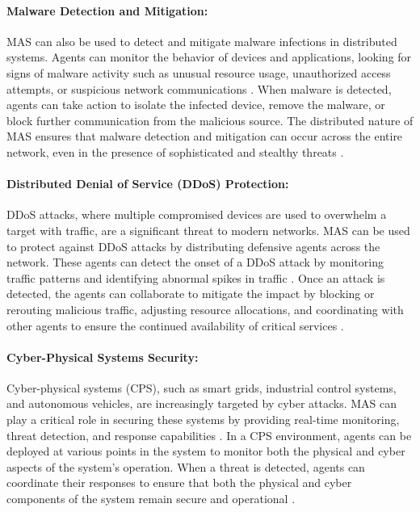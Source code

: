 \paragraph{Malware Detection and Mitigation:}
MAS can also be used to detect and mitigate malware infections in distributed systems. Agents can monitor the behavior of devices and applications, looking for signs of malware activity such as unusual resource usage, unauthorized access attempts, or suspicious network communications \cite{buczak2016survey}. When malware is detected, agents can take action to isolate the infected device, remove the malware, or block further communication from the malicious source. The distributed nature of MAS ensures that malware detection and mitigation can occur across the entire network, even in the presence of sophisticated and stealthy threats \cite{buczak2016survey}.

\paragraph{Distributed Denial of Service (DDoS) Protection:}
DDoS attacks, where multiple compromised devices are used to overwhelm a target with traffic, are a significant threat to modern networks. MAS can be used to protect against DDoS attacks by distributing defensive agents across the network. These agents can detect the onset of a DDoS attack by monitoring traffic patterns and identifying abnormal spikes in traffic \cite{buczak2016survey}. Once an attack is detected, the agents can collaborate to mitigate the impact by blocking or rerouting malicious traffic, adjusting resource allocations, and coordinating with other agents to ensure the continued availability of critical services \cite{buczak2016survey}.

\paragraph{Cyber-Physical Systems Security:}
Cyber-physical systems (CPS), such as smart grids, industrial control systems, and autonomous vehicles, are increasingly targeted by cyber attacks. MAS can play a critical role in securing these systems by providing real-time monitoring, threat detection, and response capabilities \cite{kolias2011swarm}. In a CPS environment, agents can be deployed at various points in the system to monitor both the physical and cyber aspects of the system's operation. When a threat is detected, agents can coordinate their responses to ensure that both the physical and cyber components of the system remain secure and operational \cite{kolias2011swarm}.

